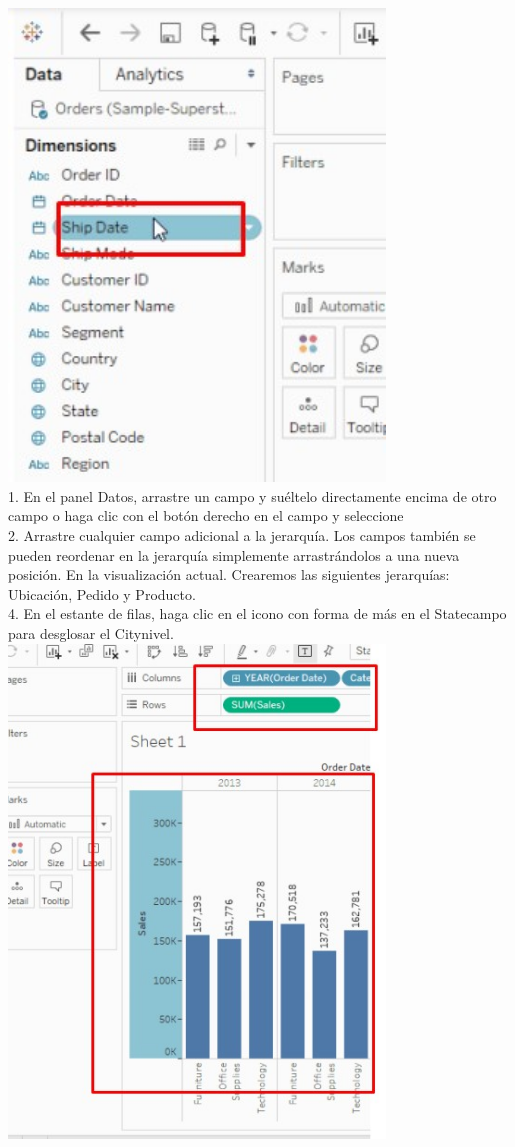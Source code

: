 \documentclass[preprint,12pt]{elsarticle}
\begin{document}
\begin{itemize}
			\\	\includegraphics[width=10cm]{./IMAGENES/6.2}
			\\ 1. En el panel Datos, arrastre un campo y suéltelo directamente encima de otro campo o haga clic
			con el botón derecho en el campo y seleccione
			\\ 2. Arrastre cualquier campo adicional a la jerarquía. Los campos también se pueden reordenar en
			la jerarquía simplemente arrastrándolos a una nueva posición. En la visualización
			actual. Crearemos las siguientes jerarquías: Ubicación, Pedido y Producto.
			\\ 4. En el estante de filas, haga clic en el icono con forma de más en el Statecampo para desglosar
			el Citynivel.
			\\	\includegraphics[width=10cm]{./IMAGENES/6.3}

\end{itemize}
\end{document}
